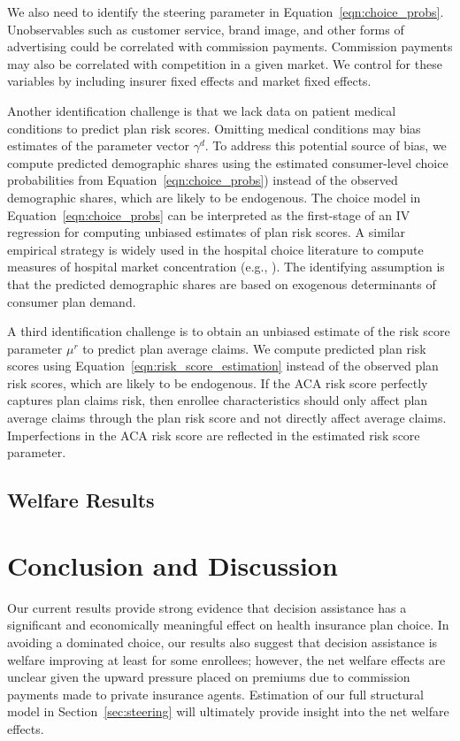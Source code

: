 \documentclass[12pt]{article}
\begin{document}
We also need to identify the steering parameter in Equation~\eqref{eqn:choice_probs}.  Unobservables such as customer service, brand image, and other forms of advertising could be correlated with commission payments. Commission payments may also be correlated with competition in a given market. We control for these variables by including insurer fixed effects and market fixed effects.  

Another identification challenge is that we lack data on patient medical conditions to predict plan risk scores. Omitting medical conditions may bias estimates of the parameter vector $\gamma^d$.  To address this potential source of bias, we compute predicted demographic shares using the estimated consumer-level choice probabilities from Equation~\eqref{eqn:choice_probs}) instead of the observed demographic shares, which are likely to be endogenous.  The choice model in Equation~\eqref{eqn:choice_probs} can be interpreted as the first-stage of an IV regression for computing unbiased estimates of plan risk scores.  A similar empirical strategy is widely used in the hospital choice literature to compute measures of hospital market concentration (e.g., \citet{Kessler2000}).  The identifying assumption is that the predicted demographic shares are based on exogenous determinants of consumer plan demand.

A third identification challenge is to obtain an unbiased estimate of the risk score parameter $\mu^r$ to predict plan average claims. We compute predicted plan risk scores using Equation~\eqref{eqn:risk_score_estimation} instead of the observed plan risk scores, which are likely to be endogenous. If the ACA risk score perfectly captures plan claims risk, then enrollee characteristics should only affect plan average claims through the plan risk score and not directly affect average claims.  Imperfections in the ACA risk score are reflected in the estimated risk score parameter.  


\subsection{Welfare Results}
\label{subsec:steering-results}


\section{Conclusion and Discussion}
\label{sec:conclusion}

Our current results provide strong evidence that decision assistance has a significant and economically meaningful effect on health insurance plan choice. In avoiding a dominated choice, our results also suggest that decision assistance is welfare improving at least for some enrollees; however, the net welfare effects are unclear given the upward pressure placed on premiums due to commission payments made to private insurance agents. Estimation of our full structural model in Section~\ref{sec:steering} will ultimately provide insight into the net welfare effects.
\end{document}
